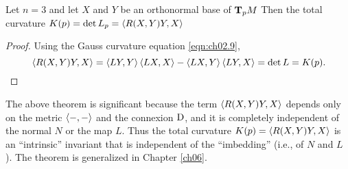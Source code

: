 \documentclass[../main]{subfiles}
\begin{document}
\begin{theorem} \label{thm:ch2.4.1}
 Let $n=3$ and let $X$ and $Y$ be an orthonormal base of $\tangentspace{M}{p}$ Then the total curvature $K(p)=\det L_{p}=\ip{R(X, Y) Y}{X}$
\end{theorem}

\begin{proof}
Using the Gauss curvature equation \ref{eqn:ch02.9},
\[\ip{R(X, Y) Y}{ X}=\ip{ L Y}{Y}\ip{L {X}}{X}-\ip{L X}{Y} \ip{L {Y}}{ X} =\det L = K(p) . \]
\end{proof}

The above theorem is significant because the term $\ip{R(X, Y) Y}{X}$ depends only on the metric $\ip{-}{-}$ and the connexion $\connection$, and it is completely independent of the normal $N$ or the map $L$. Thus the total curvature $K(p)=\ip{R(X, Y) Y}{X}$ is an ``intrinsic'' invariant that is independent of the ``imbedding'' (i.e., of $N$ and $L$ ). The theorem is generalized in Chapter \ref{ch06}.
\end{document}
